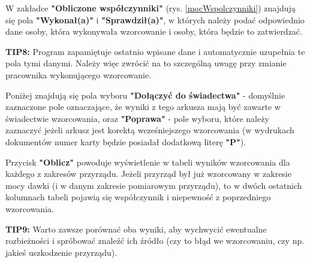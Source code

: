 W zakładce \textbf{"Obliczone współczynniki"} (rys. \ref{mocWspolczynniki}) znajdują się pola \textbf{"Wykonał(a)"} i \textbf{"Sprawdził(a)"}, w których należy podać odpowiednio dane osoby, która wykonywała wzorcowanie i osoby, która będzie to zatwierdzać. 

\textbf{TIP8:} Program zapamiętuje ostatnio wpisane dane i automatycznie uzupełnia te pola tymi danymi. Należy więc zwrócić na to szczególną uwagę przy zmianie pracownika wykonującego wzorcowanie.

Poniżej znajdują się pola wyboru \textbf{"Dołączyć do świadectwa"} - domyślnie zaznaczone pole oznaczające, że wyniki z tego arkusza mają być zawarte w świadectwie wzorcowania, oraz \textbf{"Poprawa"} - pole wyboru, które należy zaznaczyć jeżeli arkusz jest korektą wcześniejszego wzorcowania (w wydrukach dokumentów numer karty będzie posiadał dodatkową literę \textbf{"P"}).

Przycisk \textbf{"Oblicz"} powoduje wyświetlenie w tabeli wyników wzorcowania dla każdego z zakresów przyrządu. Jeżeli przyrząd był już wzorcowany w zakresie mocy dawki (i w danym zakresie pomiarowym przyrządu), to w dwóch ostatnich kolumnach tabeli pojawią się współczynnik i niepewność z poprzedniego wzorcowania. 

\textbf{TIP9:} Warto zawsze porównać oba wyniki, aby wychwycić ewentualne rozbieżności i spróbować znaleźć ich źródło (czy to błąd we wzorcowaniu, czy np. jakieś uszkodzenie przyrządu).

